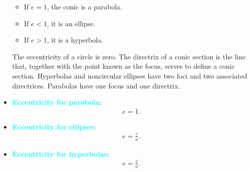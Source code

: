 \documentclass{report}
\begin{document}
\begin{itemize}
    \begin{itemize}
        \item If $e=1$, the conic is a parabola.
        \item If $e<1$, it is an ellipse.
        \item If $e>1$, it is a hyperbola.
    \end{itemize}
    The eccentricity of a circle is zero. The directrix of a conic section is the line that, together with the point known as the focus, serves to define a conic section. Hyperbolas and noncircular ellipses have two foci and two associated directrices. Parabolas have one focus and one directrix.
    \bigbreak \noindent 
    \item \textbf{\textcolor{cyan}{Eccentricity for parabola}}:
        \begin{align*}
            e=1
        .\end{align*}
    \item \textbf{\textcolor{cyan}{Eccentricity for ellipses}}:
        \begin{align*}
            e = \frac{c}{a}
        .\end{align*}
    \item \textbf{\textcolor{cyan}{Eccentricity for hyperbolas}}:
        \begin{align*}
            e = \frac{c}{a}
        .\end{align*}

    \end{itemize}
    \bigbreak \noindent 
\end{document}
